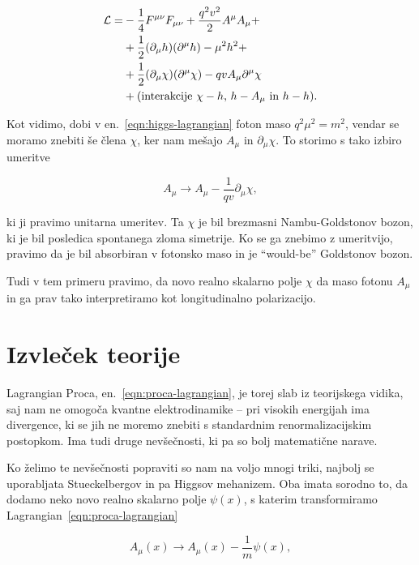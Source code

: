\documentclass[a4paper, twocolumn, titlepage]{article}
\begin{document}
\begin{align}
	\mathcal{L} =& -\frac{1}{4}F^{\mu\nu}F_{\mu\nu} + \frac{q^2v^2}{2}A^\mu A_\mu + \notag \\
	&+ \frac{1}{2}(\partial_\mu h)(\partial^\mu h) - \mu^2 h^2 + \notag \\
	&+ \frac{1}{2}(\partial_\mu\chi)(\partial^\mu\chi) - qvA_\mu\partial^\mu\chi \notag \\
	&+ (\text{interakcije $\chi - h$, $h - A_\mu$ in $h - h$}).
	\label{eqn:higgs-lagrangian}
\end{align}

Kot vidimo, dobi v en.~\eqref{eqn:higgs-lagrangian} foton maso $q^2\mu^2 = m^2$, vendar se moramo znebiti še člena $\chi$,
ker nam mešajo $A_\mu$ in $\partial_\mu \chi$. To storimo s tako izbiro umeritve

\begin{equation}
	A_\mu \to A_\mu - \frac{1}{qv}\partial_\mu\chi,
\end{equation}

ki ji pravimo unitarna umeritev. Ta $\chi$ je bil brezmasni Nambu-Goldstonov bozon, ki je bil posledica spontanega zloma
simetrije. Ko se ga znebimo z umeritvijo, pravimo da je bil absorbiran v fotonsko maso in je "`would-be"' Goldstonov bozon.

Tudi v tem primeru pravimo, da novo realno skalarno polje $\chi$ da maso fotonu $A_\mu$ in ga prav tako interpretiramo kot
longitudinalno polarizacijo.

\section{Izvleček teorije}

Lagrangian Proca, en.~\eqref{eqn:proca-lagrangian}, je torej slab iz teorijskega vidika, saj nam ne omogoča kvantne
elektrodinamike -- pri visokih energijah ima divergence, ki se jih ne moremo znebiti s standardnim renormalizacijskim
postopkom. Ima tudi druge nevšečnosti, ki pa so bolj matematične narave.

Ko želimo te nevšečnosti popraviti so nam na voljo mnogi triki, najbolj se uporabljata Stueckelbergov in pa Higgsov mehanizem.
Oba imata sorodno to, da dodamo neko novo realno skalarno polje $\psi(x)$, s katerim transformiramo
Lagrangian~\eqref{eqn:proca-lagrangian}

\begin{equation}
	A_\mu(x) \to A_\mu(x) - \frac{1}{m}\psi(x),
\end{equation}
\end{document}

